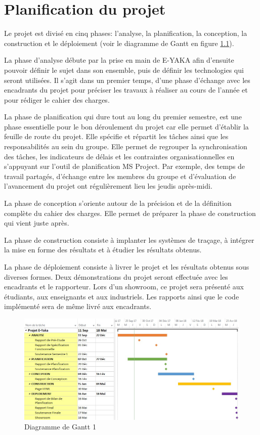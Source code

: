 \chapter{Planification du projet  }

Le projet est divisé en cinq phases: l'analyse, la planification, la conception, la construction et le déploiement (voir le diagramme de Gantt en figure \ref{gantt_1}).

La phase d'analyse débute par la prise en main de E-YAKA afin d'ensuite pouvoir définir le sujet dans son ensemble, puis de définir les technologies qui seront utilisées. Il s'agit dans un premier temps, d'une phase d'échange avec les encadrants du projet pour préciser les travaux à réaliser au cours de l'année et pour rédiger le cahier des charges.

La phase de planification qui dure tout au long du premier semestre, est une phase essentielle pour le bon déroulement du projet car elle permet d’établir la feuille de route du projet. Elle spécifie et répartit les tâches ainsi que les responsabilités au sein du groupe. Elle permet de regrouper la synchronisation des tâches, les indicateurs de délais et les contraintes organisationnelles en s'appuyant sur l’outil de planification MS Project. Par exemple, des temps de travail partagés, d'échange entre les membres du groupe et d'évaluation de l'avancement du projet ont régulièrement lieu les jeudis après-midi.

La phase de conception s'oriente autour de la précision et de la définition complète du cahier des charges. Elle permet de préparer la phase de construction qui vient juste après.

La phase de construction consiste à implanter les systèmes de traçage, à intégrer la mise en forme des résultats et à étudier les résultats obtenus.

La phase de déploiement consiste à livrer le projet et les résultats obtenus sous diverses formes. Deux démonstrations du projet seront effectuée avec les encadrants et le rapporteur. Lors d’un showroom, ce projet sera présenté aux étudiants, aux enseignants et aux industriels. Les rapports ainsi que le code implémenté sera de même livré aux encadrants.


  \begin{figure}
    \includegraphics[width=1\textwidth]{images/gantt1.jpg}
    \caption{Diagramme de Gantt 1}
    \label{gantt_1}
  \end{figure}
